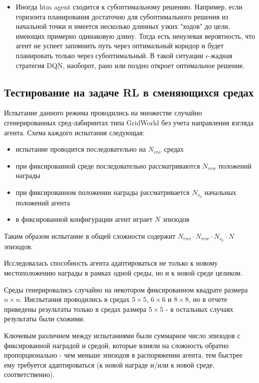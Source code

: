 \documentclass[a4paper]{article}
\begin{document}
\begin{itemize}
  \item Иногда htm agent сходится к субоптимальному решению. Например, если горизонта планирования достаточно для субоптимального решения из начальной точки и имеется несколько длинных узких "ходов" до цели, имеющих примерно одинаковую длину. Тогда есть ненулевая вероятность, что агент не успеет запомнить путь через оптимальный коридор и будет планировать только через субоптимальный. В такой ситуации $\epsilon$-жадная стратегия DQN, наоборот, рано или поздно откроет оптимальное решение.
\end{itemize}

\subsection{Тестирование на задаче RL в сменяющихся средах}

Испытание данного режима проводились на множестве случайно сгенерированных сред-лабиринтах типа GridWorld без учета направления взгляда агента. Схема каждого испытания следующая:

\begin{itemize}
  \item испытание проводится последовательно на $N_{env}$ средах
  \item при фиксированной среде последовательно рассматриваются $N_{rew}$ положений награды
  \item при фиксированном положении награды рассматривается $N_{s_0}$ начальных положений агента
  \item в фиксированной конфигурации агент играет $N$ эпизодов
\end{itemize}

Таким образом испытание в общей сложности содержит $N_{env} \cdot N_{rew} \cdot N_{s_0} \cdot N$ эпизодов.

Исследовалась способность агента адаптироваться не только к новому местоположению награды в рамках одной среды, но и к новой среде целиком.

Среды генерировались случайно на некотором фиксированном квадрате размера $n \times n$. Ииспытания проводились в средах $5 \times 5$, $6 \times 6$ и $8 \times 8$, но в отчете приведены результаты только в средах размера $5 \times 5$ - в остальных случаях результаты были схожими.

Ключевым различием между испытаниями были суммарное число эпизодов с фиксированной наградой и средой, которые влияли на сложность обратно пропорционально - чем меньше эпизодов в распоряжении агента, тем быстрее ему требуется адаптироваться (к новой награде и/или к новой среде, соответственно).
\end{document}
